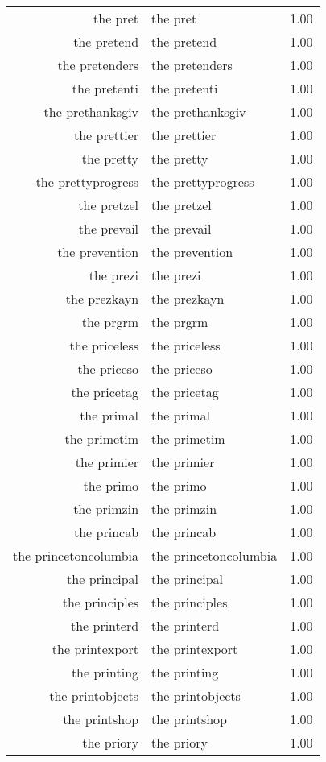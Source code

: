 \begin{table}[ht]
\begin{tabular}{rlr}
  the pret & the pret & 1.00 \\ 
  the pretend & the pretend & 1.00 \\ 
  the pretenders & the pretenders & 1.00 \\ 
  the pretenti & the pretenti & 1.00 \\ 
  the prethanksgiv & the prethanksgiv & 1.00 \\ 
  the prettier & the prettier & 1.00 \\ 
  the pretty & the pretty & 1.00 \\ 
  the prettyprogress & the prettyprogress & 1.00 \\ 
  the pretzel & the pretzel & 1.00 \\ 
  the prevail & the prevail & 1.00 \\ 
  the prevention & the prevention & 1.00 \\ 
  the prezi & the prezi & 1.00 \\ 
  the prezkayn & the prezkayn & 1.00 \\ 
  the prgrm & the prgrm & 1.00 \\ 
  the priceless & the priceless & 1.00 \\ 
  the priceso & the priceso & 1.00 \\ 
  the pricetag & the pricetag & 1.00 \\ 
  the primal & the primal & 1.00 \\ 
  the primetim & the primetim & 1.00 \\ 
  the primier & the primier & 1.00 \\ 
  the primo & the primo & 1.00 \\ 
  the primzin & the primzin & 1.00 \\ 
  the princab & the princab & 1.00 \\ 
  the princetoncolumbia & the princetoncolumbia & 1.00 \\ 
  the principal & the principal & 1.00 \\ 
  the principles & the principles & 1.00 \\ 
  the printerd & the printerd & 1.00 \\ 
  the printexport & the printexport & 1.00 \\ 
  the printing & the printing & 1.00 \\ 
  the printobjects & the printobjects & 1.00 \\ 
  the printshop & the printshop & 1.00 \\ 
  the priory & the priory & 1.00 \\ 

\end{tabular}
\end{table}
